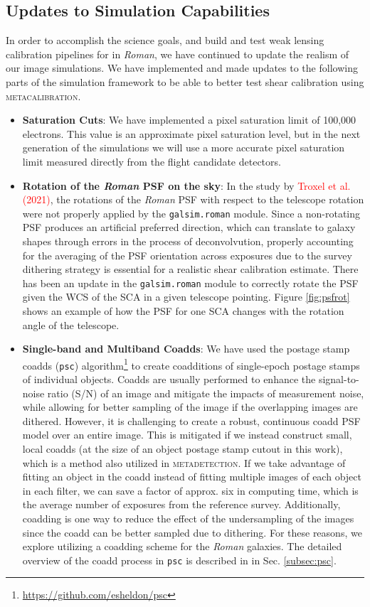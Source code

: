 \documentclass[fleqn,usenatbib]{mnras}
\begin{document}
\subsection{Updates to Simulation Capabilities}
In order to accomplish the science goals, and build and test weak lensing calibration pipelines for in \emph{Roman}, we have continued to update the realism of our image simulations. We have implemented and made updates to the following parts of the simulation framework to be able to better test shear calibration using \textsc{metacalibration}. 
\begin{itemize}
    \setlength\itemsep{1em}
    \item \textbf{Saturation Cuts}:
    We have implemented a pixel saturation limit of 100,000 electrons. This value is an approximate pixel saturation level, but in the next generation of the simulations we will use a more accurate pixel saturation limit measured directly from the flight candidate detectors. 
    
    \item \textbf{Rotation of the \emph{Roman} PSF on the sky}:
    In the study by \textcolor{red}{Troxel et al. (2021)}, the rotations of the \emph{Roman} PSF with respect to the telescope rotation were not properly applied by the \texttt{galsim.roman} module. Since a non-rotating PSF produces an artificial preferred direction, which can translate to galaxy shapes through errors in the process of deconvolvution, properly accounting for the averaging of the PSF orientation across exposures due to the survey dithering strategy is essential for a realistic shear calibration estimate. There has been an update in the \texttt{galsim.roman} module to correctly rotate the PSF given the WCS of the SCA in a given telescope pointing. Figure \ref{fig:psfrot} shows an example of how the PSF for one SCA changes with the rotation angle of the telescope.
    
    \item \textbf{Single-band and Multiband Coadds}: 
    We have used the postage stamp coadds (\texttt{psc}) algorithm\footnote{\url{https://github.com/esheldon/psc}} to create coadditions of single-epoch postage stamps of individual objects. Coadds are usually performed to enhance the signal-to-noise ratio (S/N) of an image and mitigate the impacts of measurement noise, while allowing for better sampling of the image if the overlapping images are dithered. However, it is challenging to create a robust, continuous coadd PSF model over an entire image. This is mitigated if we instead construct small, local coadds (at the size of an object postage stamp cutout in this work), which is a method also utilized in \textsc{metadetection}. If we take advantage of fitting an object in the coadd instead of fitting multiple images of each object in each filter, we can save a factor of approx. six in computing time, which is the average number of exposures from the reference survey. Additionally, coadding is one way to reduce the effect of the undersampling of the images since the coadd can be better sampled due to dithering. For these reasons, we explore utilizing a coadding scheme for the \emph{Roman} galaxies. The detailed overview of the coadd process in \texttt{psc} is described in in Sec. \ref{subsec:psc}. 
    

\end{itemize}
\end{document}
